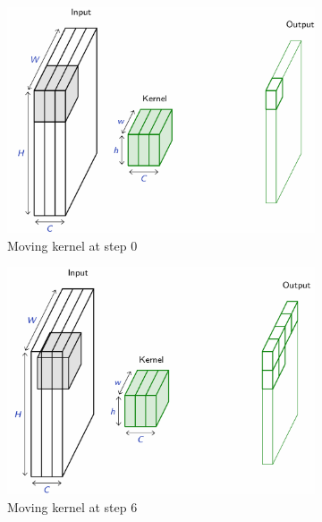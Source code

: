 \documentclass[twocolumn,superscriptaddress,aps]{revtex4-1}
\begin{document}
\begin{figure}[H]
    \centering
        \begin{subfigure}[t]{.3\textwidth}
        \includegraphics[width =\textwidth]{images/kernle_mov1.png}
        \caption{Moving kernel at step 0}
        \label{fig:kernel_mov1}
        \end{subfigure}
            \hfill
        \begin{subfigure}[t]{.3\textwidth}
        \includegraphics[width =\textwidth]{images/kernel_move2.png}
        \caption{Moving kernel at step 6}
        \label{fig:kernel_mov2}
        \end{subfigure}
            \hfill
        \begin{subfigure}[t]{.3\textwidth}

\end{subfigure}
\end{figure}
\end{document}
